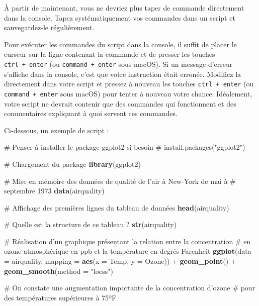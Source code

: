 \documentclass[a4paperpaper,]{article}
\newenvironment{Shaded}{\begin{snugshade}}{\end{snugshade}}
\newcommand{\CommentTok}[1]{\textcolor[rgb]{0.54,0.53,0.53}{#1}}
\newcommand{\DataTypeTok}[1]{\textcolor[rgb]{0.00,0.34,0.68}{#1}}
\newcommand{\KeywordTok}[1]{\textcolor[rgb]{0.12,0.11,0.11}{\textbf{#1}}}
\newcommand{\NormalTok}[1]{\textcolor[rgb]{0.12,0.11,0.11}{#1}}
\newcommand{\OperatorTok}[1]{\textcolor[rgb]{0.12,0.11,0.11}{#1}}
\newcommand{\StringTok}[1]{\textcolor[rgb]{0.75,0.01,0.01}{#1}}
\begin{document}
À partir de maintenant, vous ne devriez plus taper de commande directement dans la console. Tapez systématiquement vos commandes dans un script et sauvegardez-le régulièrement.

Pour exécuter les commandes du script dans la console, il suffit de placer le curseur sur la ligne contenant la commande et de presser les touches \texttt{ctrl\ +\ enter} (ou \texttt{command\ +\ enter} sous macOS). Si un message d'erreur s'affiche dans la console, c'est que votre instruction était erronée. Modifiez la directement dans votre script et pressez à nouveau les touches \texttt{ctrl\ +\ enter} (ou \texttt{command\ +\ enter} sous macOS) pour tenter à nouveau votre chance. Idéalement, votre script ne devrait contenir que des commandes qui fonctionnent et des commentaires expliquant à quoi servent ces commandes.

Ci-dessous, un exemple de script :

\begin{Shaded}
\begin{Highlighting}[]
\CommentTok{# Penser à installer le package ggplot2 si besoin}
\CommentTok{# install.packages("ggplot2")}

\CommentTok{# Chargement du package}
\KeywordTok{library}\NormalTok{(ggplot2)}

\CommentTok{# Mise en mémoire des données de qualité de l'air à New-York de mai à}
\CommentTok{# septembre 1973}
\KeywordTok{data}\NormalTok{(airquality)}

\CommentTok{# Affichage des premières lignes du tableau de données}
\KeywordTok{head}\NormalTok{(airquality)}

\CommentTok{# Quelle est la structure de ce tableau ?}
\KeywordTok{str}\NormalTok{(airquality)}

\CommentTok{# Réalisation d'un graphique présentant la relation entre la concentration}
\CommentTok{# en ozone atmosphérique en ppb et la température en degrés Farenheit}
\KeywordTok{ggplot}\NormalTok{(}\DataTypeTok{data =}\NormalTok{ airquality, }\DataTypeTok{mapping =} \KeywordTok{aes}\NormalTok{(}\DataTypeTok{x =}\NormalTok{ Temp, }\DataTypeTok{y =}\NormalTok{ Ozone)) }\OperatorTok{+}
\StringTok{  }\KeywordTok{geom_point}\NormalTok{() }\OperatorTok{+}
\StringTok{  }\KeywordTok{geom_smooth}\NormalTok{(}\DataTypeTok{method =} \StringTok{"loess"}\NormalTok{)}

\CommentTok{# On constate une augmentation importante de la concentration d'ozone }
\CommentTok{# pour des températures supérieures à 75ºF}
\end{Highlighting}
\end{Shaded}
\end{document}
